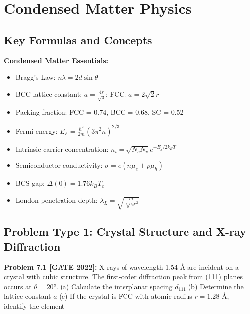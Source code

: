 \documentclass[12pt,a4paper]{article}
\begin{document}
\newpage

\section{Condensed Matter Physics}

\subsection{Key Formulas and Concepts}

\begin{theorem}
\textbf{Condensed Matter Essentials:}
\begin{itemize}
    \item Bragg's Law: $n\lambda = 2d\sin\theta$
    \item BCC lattice constant: $a = \frac{4r}{\sqrt{3}}$; FCC: $a = 2\sqrt{2}r$
    \item Packing fraction: FCC = 0.74, BCC = 0.68, SC = 0.52
    \item Fermi energy: $E_F = \frac{\hbar^2}{2m}(3\pi^2 n)^{2/3}$
    \item Intrinsic carrier concentration: $n_i = \sqrt{N_c N_v} e^{-E_g/2k_BT}$
    \item Semiconductor conductivity: $\sigma = e(n\mu_e + p\mu_h)$
    \item BCS gap: $\Delta(0) = 1.76 k_B T_c$
    \item London penetration depth: $\lambda_L = \sqrt{\frac{m}{\mu_0 n_s e^2}}$
\end{itemize}
\end{theorem}

\subsection{Problem Type 1: Crystal Structure and X-ray Diffraction}

\textbf{Problem 7.1 [GATE 2022]:} X-rays of wavelength 1.54 Å are incident on a crystal with cubic structure. The first-order diffraction peak from (111) planes occurs at $\theta = 20°$.
(a) Calculate the interplanar spacing $d_{111}$
(b) Determine the lattice constant $a$
(c) If the crystal is FCC with atomic radius $r = 1.28$ Å, identify the element
\end{document}
